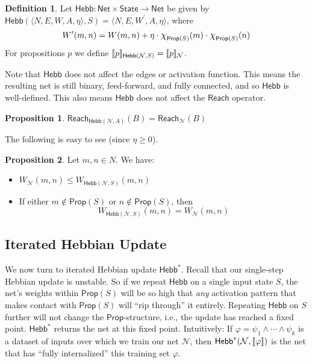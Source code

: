 \documentclass[letterpaper]{article}
\theoremstyle{definition}
\newtheorem{definition}{Definition}
\newtheorem{proposition}{Proposition}
\newcommand{\State}{\mathsf{State}}
\newcommand{\semantics}[1]{[\![\mbox{\em $ #1 $\/}]\!]}
\newcommand*{\bigchi}{\mbox{\Large$\chi$}}%
\newcommand{\AllNets}{\mathsf{Net}}
\newcommand{\Net}{\mathcal{N}}
\newcommand{\Prop}{\mathsf{Prop}}
\newcommand{\Reach}{\mathsf{Reach}}
\newcommand{\Hebb}[2]{\mathsf{Hebb}(#1, #2)}
\newcommand{\HebbNoArgs}{\mathsf{Hebb}}
\newcommand{\Hebbstar}[2]{\mathsf{Hebb}^*(#1, #2)}
\newcommand{\HebbstarNoArgs}{\mathsf{Hebb}^*}
\begin{document}
\begin{definition}
    Let $\HebbNoArgs : \AllNets \times \State \to \AllNets$ be given by $\Hebb{\langle N, E, W, A, \eta \rangle}{S} = \langle N, E, W^\prime, A, \eta \rangle$, where
    \[
        W^\prime(m, n) = W(m, n) + \eta \cdot \bigchi_{\Prop(S)}(m) \cdot \bigchi_{\Prop(S)}(n)
    \]
    For propositions $p$ we define $\semantics{p}_{\Hebb{\Net}{S}} = \semantics{p}_\Net$.
\end{definition}
Note that $\HebbNoArgs$ does not affect the edges or activation function.  This means the resulting net is still binary, feed-forward, and fully connected, and so $\HebbNoArgs$ is well-defined.  This also means $\HebbNoArgs$ does not affect the $\Reach$ operator.
\begin{proposition} $\Reach_{\Hebb{\Net}{A}}(B) = \Reach_\Net(B)$
\end{proposition}
The following is easy to see (since $\eta \geq 0$).
\begin{proposition}\label{hebb_weights}
    Let $m, n \in N$.  We have:
    \begin{itemize}
        \item $W_\Net(m, n) \leq W_{\Hebb{\Net}{S}}(m, n)$
        \item If either $m \not \in \Prop(S)$ or $n \not \in \Prop(S)$, then
        \[ W_{\Hebb{\Net}{S}}(m, n) = W_\Net(m, n) \]
    \end{itemize}
\end{proposition}

\subsection{Iterated Hebbian Update}

We now turn to iterated Hebbian update $\HebbstarNoArgs$.  Recall that our single-step Hebbian update is unstable.  So if we repeat $\HebbNoArgs$ on a single input state $S$, the net's weights within $\Prop(S)$ will be so high that \emph{any} activation pattern that makes contact with $\Prop(S)$ will ``rip through'' it entirely.  Repeating $\HebbNoArgs$ on $S$ further will not change the $\Prop$-structure, i.e., the update has reached a fixed point.  $\HebbstarNoArgs$ returns the net at this fixed point.  Intuitively: If $\varphi = \psi_1 \land \cdots \land \psi_k$ is a dataset of inputs over which we train our net $\Net$, then $\Hebbstar{\Net}{\semantics{\varphi}}$ is the net that has ``fully internalized'' this training set $\varphi$.
\end{document}
